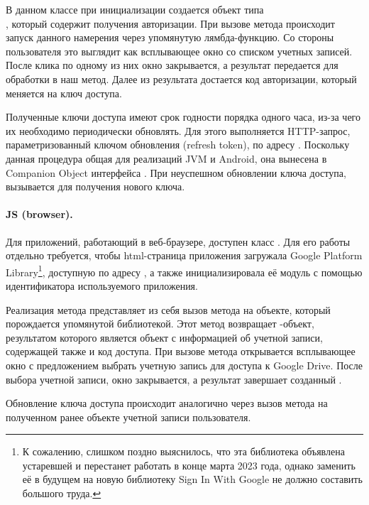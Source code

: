     В данном классе при инициализации создается объект типа\\ , который содержит  получения авторизации. При вызове метода  происходит запуск данного намерения через упомянутую лямбда-функцию. Со стороны пользователя это выглядит как всплывающее окно со списком учетных записей. После клика по одному из них окно закрывается, а результат передается для обработки в наш метод. Далее из результата достается код авторизации, который меняется на ключ доступа.

    Полученные ключи доступа имеют срок годности порядка одного часа, из-за чего их необходимо периодически обновлять. Для этого выполняется HTTP-запрос, параметризованный ключом обновления (refresh token), по адресу . Поскольку данная процедура общая для реализаций JVM и Android, она вынесена в Companion Object интерфейса . При неуспешном обновлении ключа доступа, вызывается  для получения нового ключа.
    
    \paragraph{JS (browser).} Для приложений, работающий в веб-браузере, доступен класс . Для его работы отдельно требуется, чтобы html-страница приложения загружала Google Platform Library\footnote{К сожалению, слишком поздно выяснилось, что эта библиотека объявлена устаревшей и перестанет работать в конце марта 2023 года, однако заменить её в будущем на новую библиотеку Sign In With Google не должно составить большого труда.}, доступную по адресу , а также инициализировала её модуль  с помощью идентификатора используемого приложения. 

    Реализация метода  представляет из себя вызов метода  на объекте, который порождается упомянутой библиотекой. Этот метод возвращает -объект\cite{js-promise}, результатом которого является объект с информацией об учетной записи, содержащей также и код доступа. При вызове метода  открывается всплывающее окно с предложением выбрать учетную запись для доступа к Google Drive. После выбора учетной записи, окно закрывается, а результат завершает созданный .

    Обновление ключа доступа происходит аналогично через вызов метода  на полученном ранее объекте  учетной записи пользователя.

